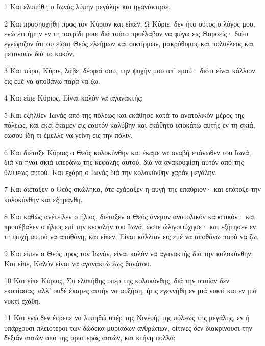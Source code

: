 \par 1 Και ελυπήθη ο Ιωνάς λύπην μεγάλην και ηγανάκτησε.
\par 2 Και προσηυχήθη προς τον Κύριον και είπεν, Ω Κύριε, δεν ήτο ούτος ο λόγος μου, ενώ έτι ήμην εν τη πατρίδι μου; διά τούτο προέλαβον να φύγω εις Θαρσείς· διότι εγνώριζον ότι συ είσαι Θεός ελεήμων και οικτίρμων, μακρόθυμος και πολυέλεος και μετανοών διά το κακόν.
\par 3 Και τώρα, Κύριε, λάβε, δέομαί σου, την ψυχήν μου απ' εμού· διότι είναι κάλλιον εις εμέ να αποθάνω παρά να ζω.
\par 4 Και είπε Κύριος, Είναι καλόν να αγανακτής;
\par 5 Και εξήλθεν Ιωνάς από της πόλεως και εκάθησε κατά το ανατολικόν μέρος της πόλεως, και εκεί έκαμεν εις εαυτόν καλύβην και εκάθητο υποκάτω αυτής εν τη σκιά, εωσού ίδη τι έμελλε να γείνη εις την πόλιν.
\par 6 Και διέταξε Κύριος ο Θεός κολοκύνθην και έκαμε να αναβή επάνωθεν του Ιωνά, διά να ήναι σκιά υπεράνω της κεφαλής αυτού, διά να ανακουφίση αυτόν από της θλίψεως αυτού. Και εχάρη ο Ιωνάς διά την κολοκύνθην χαράν μεγάλην.
\par 7 Και διέταξεν ο Θεός σκώληκα, ότε εχάραξεν η αυγή της επαύριον· και επάταξε την κολοκύνθην και εξηράνθη.
\par 8 Και καθώς ανέτειλεν ο ήλιος, διέταξεν ο Θεός άνεμον ανατολικόν καυστικόν· και προσέβαλεν ο ήλιος επί την κεφαλήν του Ιωνά, ώστε ώλιγοψύχησε· και εζήτησεν εν τη ψυχή αυτού να αποθάνη, και είπεν, Είναι κάλλιον εις εμέ να αποθάνω παρά να ζω.
\par 9 Και είπεν ο Θεός προς τον Ιωνάν, είναι καλόν να αγανακτής διά την κολοκύνθην; Και είπε, Καλόν είναι να αγανακτώ έως θανάτου.
\par 10 Και είπε Κύριος, Συ ελυπήθης υπέρ της κολοκύνθης, διά την οποίαν δεν εκοπίασας, αλλ' ουδέ έκαμες αυτήν να αυξήση, ήτις εγεννήθη εν μιά νυκτί και εν μιά νυκτί εχάθη.
\par 11 Και εγώ δεν έπρεπε να λυπηθώ υπέρ της Νινευή, της πόλεως της μεγάλης, εν ή υπάρχουσι πλειότεροι των δώδεκα μυριάδων ανθρώπων, οίτινες δεν διακρίνουσι την δεξιάν αυτών από της αριστεράς αυτών, και κτήνη πολλά;


